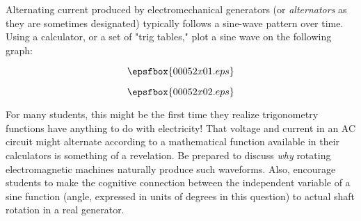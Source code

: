 

Alternating current produced by electromechanical generators (or {\it alternators} as they are sometimes designated) typically follows a sine-wave pattern over time.  Using a calculator, or a set of "trig tables," plot a sine wave on the following graph:

$$\epsfbox{00052x01.eps}$$







$$\epsfbox{00052x02.eps}$$







For many students, this might be the first time they realize trigonometry functions have anything to do with electricity!  That voltage and current in an AC circuit might alternate according to a mathematical function available in their calculators is something of a revelation.  Be prepared to discuss {\it why} rotating electromagnetic machines naturally produce such waveforms.  Also, encourage students to make the cognitive connection between the independent variable of a sine function (angle, expressed in units of degrees in this question) to actual shaft rotation in a real generator.




